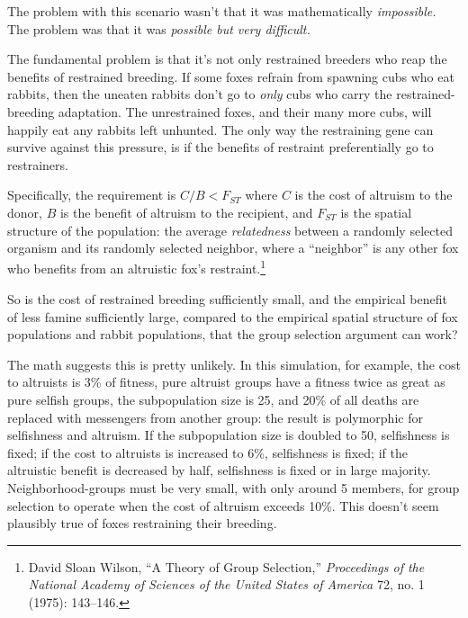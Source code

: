 {
 The problem with this scenario wasn't that it was
mathematically \textit{impossible.} The problem was that it was
\textit{possible but very difficult.}}

{
 The fundamental problem is that it's not only
restrained breeders who reap the benefits of restrained breeding. If
some foxes refrain from spawning cubs who eat rabbits, then the uneaten
rabbits don't go to \textit{only} cubs who carry the
restrained-breeding adaptation. The unrestrained foxes, and their many
more cubs, will happily eat any rabbits left unhunted. The only way the
restraining gene can survive against this pressure, is if the benefits
of restraint preferentially go to restrainers.}

{
 Specifically, the requirement is $C/B <
F_{ST}$ where $C$ is the cost of altruism to the donor, $B$ is
the benefit of altruism to the recipient, and $F_{ST}$ is
the spatial structure of the population: the average
\textit{relatedness} between a randomly selected organism and its
randomly selected neighbor, where a
``neighbor'' is any other fox who
benefits from an altruistic fox's
restraint.\footnote{David Sloan Wilson, ``A Theory of Group
Selection,'' \textit{Proceedings of the National
Academy of Sciences of the United States of America} 72, no. 1 (1975):
143--146.}}

{
 So is the cost of restrained breeding sufficiently small, and the
empirical benefit of less famine sufficiently large, compared to the
empirical spatial structure of fox populations and rabbit populations,
that the group selection argument can work?}

{
 The math suggests this is pretty unlikely. In this simulation, for
example, the cost to altruists is 3\% of fitness, pure altruist groups
have a fitness twice as great as pure selfish groups, the subpopulation
size is 25, and 20\% of all deaths are replaced with messengers from
another group: the result is polymorphic for selfishness and altruism.
If the subpopulation size is doubled to 50, selfishness is fixed; if
the cost to altruists is increased to 6\%, selfishness is fixed; if the
altruistic benefit is decreased by half, selfishness is fixed or in
large majority. Neighborhood-groups must be very small, with only
around 5 members, for group selection to operate when the cost of
altruism exceeds 10\%. This doesn't seem plausibly true
of foxes restraining their breeding.}

